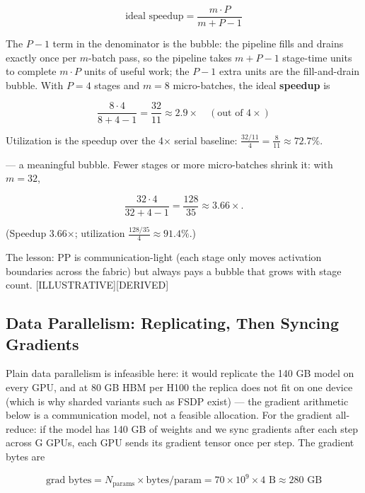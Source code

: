 \[
\text{ideal speedup} = \frac{m \cdot P}{m + P - 1}
\]

The \(P{-}1\) term in the denominator is the bubble: the pipeline fills
and drains exactly once per \(m\)-batch pass, so the pipeline takes
\(m+P-1\) stage-time units to complete \(m \cdot P\) units of useful
work; the \(P{-}1\) extra units are the fill-and-drain bubble. With
\(P = 4\) stages and \(m = 8\) micro-batches, the ideal \textbf{speedup}
is

\[
\frac{8 \cdot 4}{8 + 4 - 1} = \frac{32}{11} \approx 2.9\times \quad (\text{out of } 4\times)
\]

Utilization is the speedup over the 4× serial baseline:
\(\frac{32/11}{4} = \frac{8}{11} \approx 72.7\%\).

--- a meaningful bubble. Fewer stages or more micro-batches shrink it:
with \(m = 32\),

\[
\frac{32 \cdot 4}{32 + 4 - 1} = \frac{128}{35} \approx 3.66\times.
\]

(Speedup 3.66×; utilization \(\frac{128/35}{4} \approx 91.4\%\).)

The lesson: PP is communication-light (each stage only moves activation
boundaries across the fabric) but always pays a bubble that grows with
stage count. \mbox{{[}ILLUSTRATIVE{]}}\hspace{0pt}\mbox{{[}DERIVED{]}}

\subsection{Data Parallelism: Replicating, Then Syncing
Gradients}\label{data-parallelism-replicating-then-syncing-gradients}

Plain data parallelism is infeasible here: it would replicate the 140 GB
model on every GPU, and at 80 GB HBM per H100 the replica does not fit
on one device (which is why sharded variants such as FSDP exist) --- the
gradient arithmetic below is a communication model, not a feasible
allocation. For the gradient all-reduce: if the model has 140 GB of
weights and we sync gradients after each step across G GPUs, each GPU
sends its gradient tensor once per step. The gradient bytes are

\[
\text{grad bytes} = N_\text{params} \times \text{bytes/param} = 70 \times 10^9 \times 4 \text{ B} \approx 280 \text{ GB}
\]


